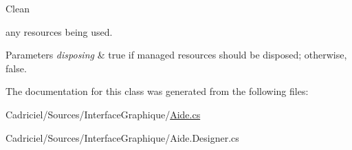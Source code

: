 Clean 

any resources being used. 


\begin{DoxyParams}{Parameters}
{\em disposing} & true if managed resources should be disposed; otherwise, false.\\
\hline
\end{DoxyParams}


The documentation for this class was generated from the following files\+:\begin{DoxyCompactItemize}
\item 
Cadriciel/\+Sources/\+Interface\+Graphique/\hyperlink{_aide_8cs}{Aide.\+cs}\item 
Cadriciel/\+Sources/\+Interface\+Graphique/Aide.\+Designer.\+cs\end{DoxyCompactItemize}
